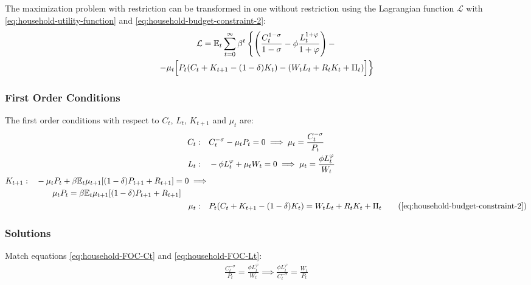 \documentclass[
thesis.tex
]{subfiles}
\begin{document}
	The maximization problem with restriction can be transformed in one without restriction using the Lagrangian function $\mathcal{L}$ with \ref{eq:household-utility-function} and \ref{eq:household-budget-constraint-2}:
	\begin{multline}
		\label{eq:household-lagrangian}
		\mathcal{L} = \mathbb{E}_t \sum_{t=0}^{\infty} \beta^t 
		\left\{ \left( \frac{C_t^{1-\sigma}}{1-\sigma} - \phi \frac{L_t^{1+\varphi}}{1+\varphi} \right) - \right.
		\\
		\left. -\mu_t \Bigr[ P_t (C_t + K_{t+1} - (1-\delta) K_t) - (W_t L_t + R_t K_t + \Pi_t) \Bigl] \right\}
	\end{multline}
	
	\subsubsection*{First Order Conditions}
	
	The first order conditions with respect to $C_t$, $L_t$, $K_{t+1}$ and $\mu_t$ are:
	\begin{align}
		C_t: \quad & C_t^{-\sigma} -\mu_t P_t = 0 \implies \mu_t = \frac{C_t^{-\sigma}}{P_t} \label{eq:household-FOC-Ct} \\
		L_t: \quad & -\phi L_t^{\varphi} +\mu_t W_t = 0 \implies \mu_t = \frac{\phi L_t^{\varphi}}{W_t} \label{eq:household-FOC-Lt} \\
		\begin{split}
			K_{t+1}: \quad & -\mu_t P_t +\beta \mathbb{E}_t \mu_{t+1} [(1-\delta) P_{t+1} + R_{t+1}] = 0 \implies \\ & \qquad \mu_t P_t = \beta \mathbb{E}_t \mu_{t+1} [(1-\delta) P_{t+1} + R_{t+1}]
		\end{split} \label{eq:household-FOC-Kt} \\
		\mu_t: \quad & P_t (C_t + K_{t+1} - (1-\delta)K_t) = W_t L_t + R_t K_t + \Pi_t \tag{\ref{eq:household-budget-constraint-2}}
	\end{align}
	
	\subsubsection*{Solutions}
	
	Match equations \ref{eq:household-FOC-Ct} and \ref{eq:household-FOC-Lt}:
	\begin{align}
		\label{eq:household-labor-supply}
		\frac{C_t^{-\sigma}}{P_t} = \frac{\phi L_t^{\varphi}}{W_t} \implies 
		\frac{\phi L_t^{\varphi}}{C_t^{-\sigma}} = \frac{W_t}{P_t}
	\end{align}
	
\end{document}
